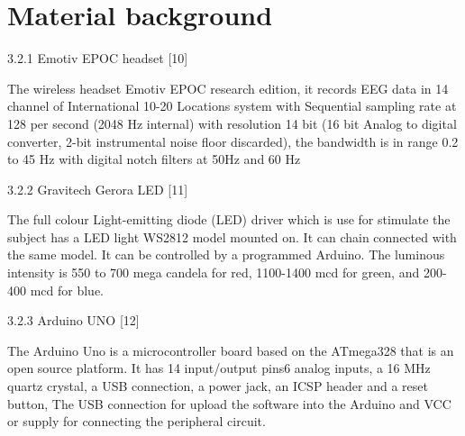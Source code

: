 \section{Material background}

3.2.1 Emotiv EPOC headset [10]

The wireless headset Emotiv EPOC research edition, it records EEG data in 14 channel of International 10-20 Locations system with Sequential sampling rate at 128 per second (2048 Hz internal) with resolution 14 bit (16 bit Analog to digital converter, 2-bit instrumental noise floor discarded), the bandwidth is in range 0.2 to 45 Hz with digital notch filters at 50Hz and 60 Hz

3.2.2 Gravitech Gerora LED [11]

The full colour Light-emitting diode (LED) driver which is use for stimulate the subject has a LED light WS2812 model mounted on. It can chain connected with the same model. It can be controlled by a programmed Arduino. The luminous intensity is 550 to 700 mega candela for red, 1100-1400 mcd for green, and 200-400 mcd for blue.

3.2.3 Arduino UNO [12]

The Arduino Uno is a microcontroller board based on the ATmega328 that is an open source platform. It has 14 input/output pins6 analog inputs, a 16 MHz quartz crystal, a USB connection, a power jack, an ICSP header and a reset button, The USB connection for upload the software into the Arduino and VCC or supply for connecting the peripheral circuit.   
